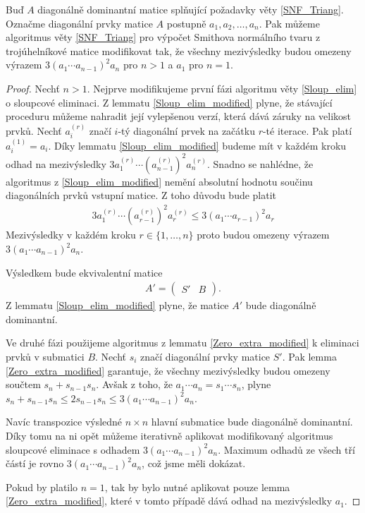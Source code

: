 \begin{vet} \label{SNF_Triang_modified}
Buď $ A $ diagonálně dominantní matice splňující požadavky věty \ref{SNF_Triang}.
Označme diagonální prvky matice $ A $ postupně $ a_1, a_2, \dots, a_n $.
Pak můžeme algoritmus věty \ref{SNF_Triang} pro výpočet Smithova normálního 
tvaru z trojúhelníkové matice modifikovat tak, že všechny mezivýsledky budou 
omezeny výrazem $ 3 (a_1 \cdots a_{n - 1})^2 a_n $ pro $ n > 1 $ a $ a_1 $ 
pro $ n = 1 $.
\end{vet}
\begin{proof}
Nechť $ n > 1 $.
Nejprve modifikujeme první fázi algoritmu věty \ref{Sloup_elim} o sloupcové 
eliminaci. Z lemmatu \ref{Sloup_elim_modified} plyne, že stávající proceduru 
můžeme nahradit její vylepšenou verzí, která dává záruky na velikost prvků. 
Nechť $ a_i^{(r)} $ značí $ i $-tý diagonální prvek na začátku $ r $-té 
iterace. Pak platí $ a_i^{(1)} = a_i $. Díky lemmatu \ref{Sloup_elim_modified}
budeme mít v každém kroku odhad na mezivýsledky 
$ 3 a_1^{(r)} \cdots (a_{n - 1}^{(r)})^2 a_n^{(r)} $.
Snadno se nahlédne, že algoritmus z \ref{Sloup_elim_modified} nemění absolutní 
hodnotu součinu diagonálních prvků vstupní matice. Z toho důvodu bude platit
\begin{align*}
    3 a_1^{(r)} \cdots (a_{r - 1}^{(r)})^2 a_r^{(r)}
        \leq 3 (a_1 \cdots a_{r - 1})^2 a_r
\end{align*}
Mezivýsledky v každém kroku $ r \in \{1, \dots, n \} $ proto budou omezeny 
výrazem $ 3 (a_1 \cdots a_{n - 1})^2 a_n $.

Výsledkem bude ekvivalentní matice
\begin{align*}
A' =
    \left(
    \begin{array}{c|c}
        S' & B
    \end{array}
    \right)
.
\end{align*}
Z lemmatu \ref{Sloup_elim_modified} plyne, že matice $ A' $ bude diagonálně
dominantní.

Ve druhé fázi použijeme algoritmus z lemmatu \ref{Zero_extra_modified}
k eliminaci prvků v submatici $ B $. Nechť $ s_i $ značí diagonální prvky matice 
$ S' $. Pak lemma \ref{Zero_extra_modified} garantuje, že všechny mezivýsledky 
budou omezeny součtem $ s_n + s_{n - 1} s_n $. Avšak z toho, že 
$ a_1 \cdots a_n = s_1 \cdots s_n $, plyne 
$ s_n + s_{n - 1} s_n \leq 2 s_{n - 1} s_n \leq 3 (a_1 \cdots a_{n - 1})^2 a_n $.

Navíc transpozice výsledné $ n \times n $ hlavní submatice bude diagonálně 
dominantní. Díky tomu na ni opět můžeme iterativně aplikovat modifikovaný 
algoritmus sloupcové eliminace s odhadem $ 3 (a_1 \cdots a_{n - 1})^2 a_n $.
Maximum odhadů ze všech tří částí je rovno $ 3 (a_1 \cdots a_{n - 1})^2 a_n $, 
což jsme měli dokázat.

Pokud by platilo $ n = 1 $, tak by bylo nutné aplikovat pouze lemma 
\ref{Zero_extra_modified}, které v tomto případě dává odhad na mezivýsledky
$ a_1 $.
\end{proof}






